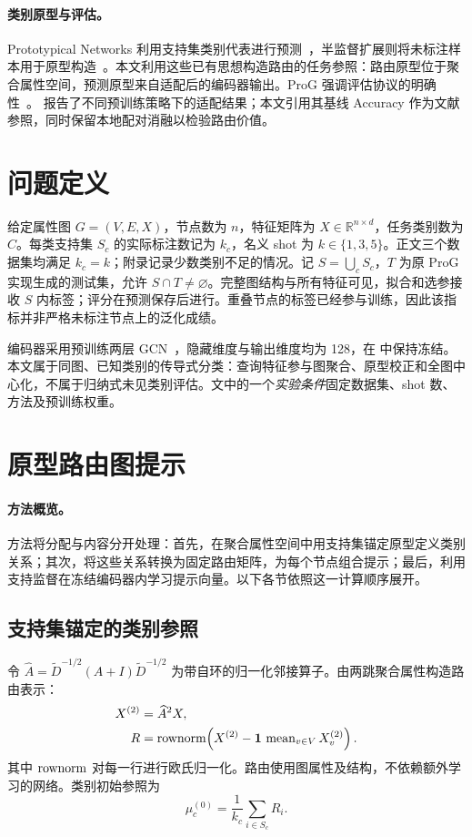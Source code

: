 \paragraph{类别原型与评估。}
Prototypical Networks 利用支持集类别代表进行预测~\citep{proto2017}，半监督扩展则将未标注样本用于原型构造~\citep{semiproto2018}。本文利用这些已有思想构造路由的任务参照：路由原型位于聚合属性空间，预测原型来自适配后的编码器输出。ProG 强调评估协议的明确性~\citep{prog2024}。\citet{mtg2026} 报告了不同预训练策略下的适配结果；本文引用其基线 Accuracy 作为文献参照，同时保留本地配对消融以检验路由价值。

\section{问题定义}
给定属性图 $G=(V,E,X)$，节点数为 $n$，特征矩阵为 $X\in\mathbb R^{n\times d}$，任务类别数为 $C$。每类支持集 $S_c$ 的实际标注数记为 $k_c$，名义 shot 为 $k\in\{1,3,5\}$。正文三个数据集均满足 $k_c=k$；附录记录少数类别不足的情况。记 $S=\bigcup_c S_c$，$T$ 为原 ProG 实现生成的测试集，允许 $S\cap T\ne\varnothing$。完整图结构与所有特征可见，拟合和选参接收 $S$ 内标签；评分在预测保存后进行。重叠节点的标签已经参与训练，因此该指标并非严格未标注节点上的泛化成绩。

编码器采用预训练两层 GCN~\citep{gcn2017}，隐藏维度与输出维度均为 128，在 \method 中保持冻结。本文属于同图、已知类别的传导式分类：查询特征参与图聚合、原型校正和全图中心化，不属于归纳式未见类别评估。文中的一个\emph{实验条件}固定数据集、shot 数、方法及预训练权重。

\section{原型路由图提示}
\label{sec:method}

\paragraph{方法概览。}
方法将分配与内容分开处理：首先，在聚合属性空间中用支持集锚定原型定义类别关系；其次，将这些关系转换为固定路由矩阵，为每个节点组合提示；最后，利用支持监督在冻结编码器内学习提示向量。以下各节依照这一计算顺序展开。
\subsection{支持集锚定的类别参照}
令 $\widehat A=\widetilde D^{-1/2}(A+I)\widetilde D^{-1/2}$ 为带自环的归一化邻接算子。由两跳聚合属性构造路由表示：
\begin{equation}
\begin{aligned}
X^{(2)}&=\widehat A^2X,\\
R&=\operatorname{rownorm}\!\left(X^{(2)}-\mathbf1\,\operatorname{mean}_{v\in V}X^{(2)}_v\right).
\end{aligned}
\label{eq:attributes}
\end{equation}
其中 $\operatorname{rownorm}$ 对每一行进行欧氏归一化。路由使用图属性及结构，不依赖额外学习的网络。类别初始参照为
\begin{equation}
\mu_c^{(0)}=\frac{1}{k_c}\sum_{i\in S_c}R_i.
\label{eq:anchor}
\end{equation}

